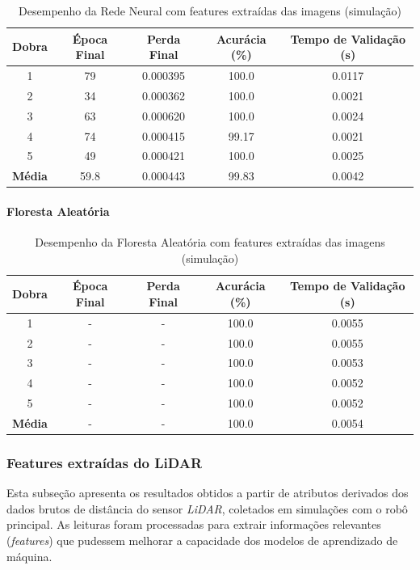 \begin{table}[H]
\centering
\caption{Desempenho da Rede Neural com features extraídas das imagens (simulação)}
\label{tab:nn_feat_img_simu}
\begin{tabular}{ccccc}
\hline
\textbf{Dobra} & \textbf{Época Final} & \textbf{Perda Final} & \textbf{Acurácia (\%)} & \textbf{Tempo de Validação (s)} \\
\hline
1 & 79 & 0.000395 & 100.0 & 0.0117 \\
2 & 34 & 0.000362 & 100.0 & 0.0021 \\
3 & 63 & 0.000620 & 100.0 & 0.0024 \\
4 & 74 & 0.000415 & 99.17 & 0.0021 \\
5 & 49 & 0.000421 & 100.0 & 0.0025 \\
\hline
\textbf{Média} & 59.8 & 0.000443 & 99.83 & 0.0042 \\
\hline
\end{tabular} \fonte{}
\end{table}

\paragraph{Floresta Aleatória}

\begin{table}[H]
\centering
\caption{Desempenho da Floresta Aleatória com features extraídas das imagens (simulação)}
\label{tab:rf_feat_img_simu}
\begin{tabular}{ccccc}
\hline
\textbf{Dobra} & \textbf{Época Final} & \textbf{Perda Final} & \textbf{Acurácia (\%)} & \textbf{Tempo de Validação (s)} \\
\hline
1 & - & - & 100.0 & 0.0055 \\
2 & - & - & 100.0 & 0.0055 \\
3 & - & - & 100.0 & 0.0053 \\
4 & - & - & 100.0 & 0.0052 \\
5 & - & - & 100.0 & 0.0052 \\
\hline
\textbf{Média} & - & - & 100.0 & 0.0054 \\
\hline
\end{tabular} \fonte{}
\end{table}

\subsubsection{Features extraídas do LiDAR}

Esta subseção apresenta os resultados obtidos a partir de atributos derivados dos dados brutos de distância do sensor \textit{LiDAR}, coletados em simulações com o robô principal. As leituras foram processadas para extrair informações relevantes (\textit{features}) que pudessem melhorar a capacidade dos modelos de aprendizado de máquina.

